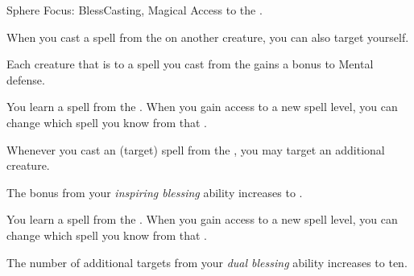     \begin{feat}{Sphere Focus: Bless}{Casting, Magical}
        \featpre Access to the  .

         When you cast a spell from the   on another creature, you can also target yourself.

         Each creature that is  to a spell you cast from the   gains a  bonus to Mental defense.

         You learn a spell from the  .
        When you gain access to a new spell level, you can change which spell you know from that .

         Whenever you cast an  (target) spell from the  , you may target an additional creature.

         The bonus from your \textit{inspiring blessing} ability increases to .

         You learn a spell from the  .
        When you gain access to a new spell level, you can change which spell you know from that .

         The number of additional targets from your \textit{dual blessing} ability increases to ten.
    \end{feat}

